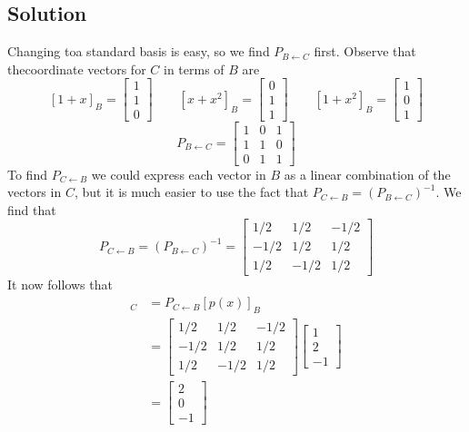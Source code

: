 \subsection*{Solution}
Changing toa standard basis is easy, so we find $P_{B\leftarrow C}$ first.
Observe that thecoordinate vectors for $C$ in terms of $B$ are
\[[1+x]_B=\begin{bmatrix}
        1 \\1\\0
    \end{bmatrix} \qquad [x+x^2]_B=\begin{bmatrix}
        0 \\1\\1
    \end{bmatrix} \qquad [1+x^2]_B=\begin{bmatrix}
        1 \\0\\1
    \end{bmatrix}\]
\[P_{B\leftarrow C}=\begin{bmatrix}
        1 & 0 & 1 \\
        1 & 1 & 0 \\
        0 & 1 & 1
    \end{bmatrix}\]
To find $P_{C\leftarrow B}$ we could express each vector in $B$ as a linear
combination of the vectors in $C$, but it is much easier to use the fact that
$P_{C\leftarrow B}=(P_{B\leftarrow C})^{-1}$. We find that
\[P_{C\leftarrow B}=(P_{B\leftarrow C})^{-1}=\begin{bmatrix}
        1/2  & 1/2  & -1/2 \\
        -1/2 & 1/2  & 1/2  \\
        1/2  & -1/2 & 1/2
    \end{bmatrix}\]
It now follows that
\begin{align*}
    [p(x)]_C & =P_{C\leftarrow B}[p(x)]_B                            \\
             & =\begin{bmatrix}
        1/2  & 1/2  & -1/2 \\
        -1/2 & 1/2  & 1/2  \\
        1/2  & -1/2 & 1/2
    \end{bmatrix}\begin{bmatrix}
        1 \\2\\-1
    \end{bmatrix} \\
             & =\begin{bmatrix}
        2 \\0\\-1
    \end{bmatrix}
\end{align*}

